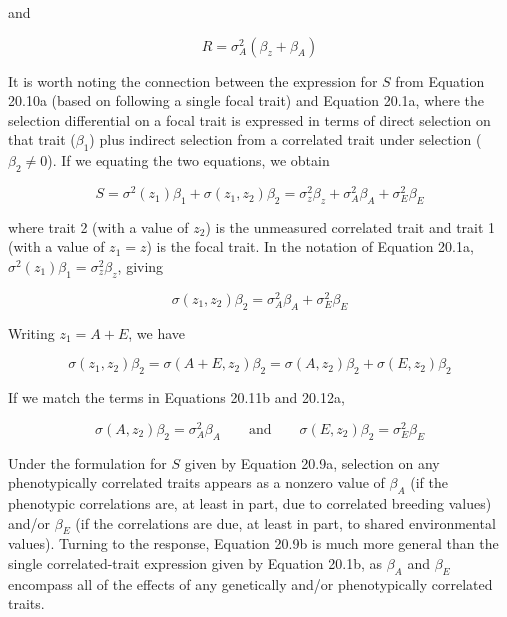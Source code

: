 \documentclass{article}
\begin{document}
and

\begin{equation}
R=\sigma_{A}^{2}(\beta_{z}+\beta_{A})
\tag{20.10b}
\label{eq:20_10b}
\end{equation}

It is worth noting the connection between the expression for $S$ from Equation 20.10a (based on following a single focal trait) and Equation 20.1a, where the selection differential on a focal trait is expressed in terms of direct selection on that trait ($\beta_1$) plus indirect selection from a correlated trait under selection ($\beta_2 \neq 0$). If we equating the two equations, we obtain

\begin{equation}
S=\sigma^{2}(z_{1})\beta_{1}+\sigma(z_{1},z_{2})\beta_{2}=\sigma_{z}^{2}\beta_{z}+\sigma_{A}^{2}\beta_{A}+\sigma_{E}^{2}\beta_{E}
\tag{20.11a}
\label{eq:20_11a}
\end{equation}

where trait 2 (with a value of  $ z_2 $) is the unmeasured correlated trait and trait 1 (with a value of  $ z_1 = z $) is the focal trait. In the notation of Equation 20.1a,  $ \sigma^2(z_1)\beta_1 = \sigma_z^2\beta_z $, giving

\begin{equation}
\sigma(z_{1},z_{2})\beta_{2}=\sigma_{A}^{2}\beta_{A}+\sigma_{E}^{2}\beta_{E}
\tag{20.11b}
\label{eq:20_11b}
\end{equation}

Writing  $ z_{1}=A+E $, we have

\begin{equation}
\sigma(z_{1},z_{2})\beta_{2}=\sigma(A+E,z_{2})\beta_{2}=\sigma(A,z_{2})\beta_{2}+\sigma(E,z_{2})\beta_{2}
\tag{20.12a}
\label{eq:20_12a}
\end{equation}

If we match the terms in Equations 20.11b and 20.12a,

\begin{equation}
\sigma(A,z_{2})\beta_{2}=\sigma_{A}^{2}\beta_{A}\qquad\mathrm{a n d}\qquad\sigma(E,z_{2})\beta_{2}=\sigma_{E}^{2}\beta_{E}
\tag{20.12b}
\label{eq:20_12b}
\end{equation}

Under the formulation for $S$ given by Equation 20.9a, selection on any phenotypically correlated traits appears as a nonzero value of $\beta_A$ (if the phenotypic correlations are, at least in part, due to correlated breeding values) and/or $\beta_E$ (if the correlations are due, at least in part, to shared environmental values). Turning to the response, Equation 20.9b is much more general than the single correlated-trait expression given by Equation 20.1b, as $\beta_A$ and $\beta_E$ encompass all of the effects of any genetically and/or phenotypically correlated traits.
\end{document}
